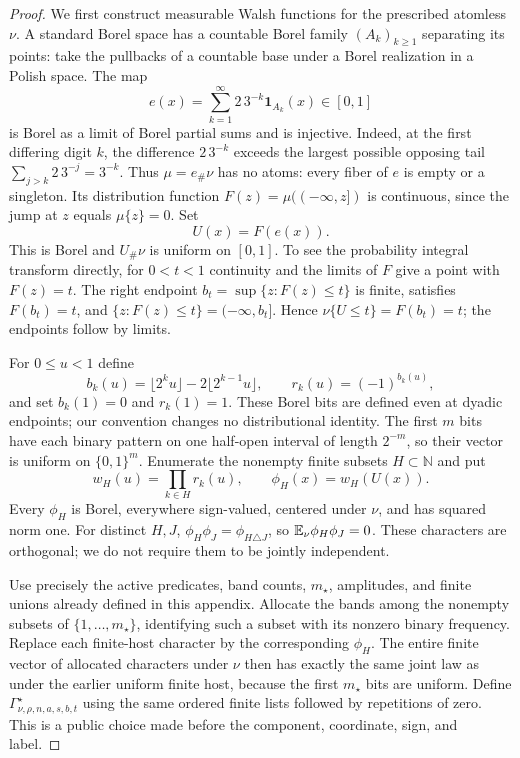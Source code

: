 \begin{proof}
We first construct measurable Walsh functions for the prescribed atomless
\(\nu\).  A standard Borel space has a countable Borel family
\((A_k)_{k\ge1}\) separating its points: take the pullbacks of a countable
base under a Borel realization in a Polish space.  The map
\[
 e(x)=\sum_{k=1}^{\infty}2\,3^{-k}\mathbf1_{A_k}(x)\in[0,1]
\]
is Borel as a limit of Borel partial sums and is injective.  Indeed, at the
first differing digit \(k\), the difference \(2\,3^{-k}\) exceeds the
largest possible opposing tail \(\sum_{j>k}2\,3^{-j}=3^{-k}\).
Thus \(\mu=e_\#\nu\) has no atoms: every fiber of \(e\) is empty or a
singleton.  Its distribution function
\(F(z)=\mu(( -\infty,z])\) is continuous, since the jump at \(z\) equals
\(\mu\{z\}=0\).  Set
\[
 U(x)=F(e(x)).
\]
This is Borel and \(U_\#\nu\) is uniform on \([0,1]\).  To see the
probability integral transform directly, for \(0<t<1\) continuity and the
limits of \(F\) give a point with \(F(z)=t\).  The right endpoint
\(b_t=\sup\{z:F(z)\le t\}\) is finite, satisfies \(F(b_t)=t\), and
\(\{z:F(z)\le t\}=(-\infty,b_t]\).  Hence
\(\nu\{U\le t\}=F(b_t)=t\); the endpoints follow by limits.

For \(0\le u<1\) define
\[
 b_k(u)=\lfloor2^ku\rfloor-2\lfloor2^{k-1}u\rfloor,\qquad
 r_k(u)=(-1)^{b_k(u)},
\]
and set \(b_k(1)=0\) and \(r_k(1)=1\).  These Borel bits are defined even at dyadic
endpoints; our convention changes no distributional identity.  The first
\(m\) bits have each binary pattern on one half-open interval of length
\(2^{-m}\), so their vector is uniform on \(\{0,1\}^m\).
Enumerate the nonempty finite subsets \(H\subset\mathbb N\) and put
\[
 w_H(u)=\prod_{k\in H}r_k(u),\qquad \phi_H(x)=w_H(U(x)).
\]
Every \(\phi_H\) is Borel, everywhere sign-valued, centered under \(\nu\),
and has squared norm one.  For distinct \(H,J\),
\(\phi_H\phi_J=\phi_{H\triangle J}\), so
\(\mathbb E_\nu\phi_H\phi_J=0\).  These characters are orthogonal; we do not
require them to be jointly independent.

Use precisely the active predicates, band counts, \(m_\star\), amplitudes,
and finite unions already defined in this appendix.  Allocate the bands
among the nonempty subsets of \(\{1,\ldots,m_\star\}\), identifying such
a subset with its nonzero binary frequency.  Replace each finite-host
character by the corresponding \(\phi_H\).  The entire finite vector of
allocated characters under \(\nu\) then has exactly the same joint law
as under the earlier uniform finite host, because the first \(m_\star\)
bits are uniform.  Define \(\Gamma^\star_{\nu,\rho,n,a,s,b,t}\) using the
same ordered finite lists followed by repetitions of zero.  This is a
public choice made before the component, coordinate, sign, and label.


\end{proof}
